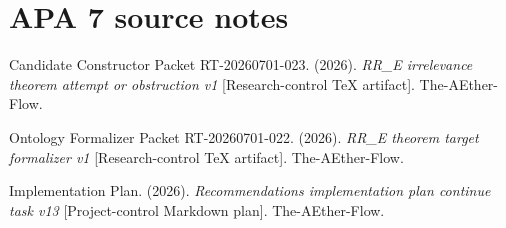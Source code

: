\documentclass[11pt]{article}
\begin{document}
\section{APA 7 source notes}

Candidate Constructor Packet RT-20260701-023. (2026). \emph{RR\_E
irrelevance theorem attempt or obstruction v1} [Research-control TeX
artifact]. The-AEther-Flow.

Ontology Formalizer Packet RT-20260701-022. (2026). \emph{RR\_E theorem
target formalizer v1} [Research-control TeX artifact]. The-AEther-Flow.

Implementation Plan. (2026). \emph{Recommendations implementation plan
continue task v13} [Project-control Markdown plan]. The-AEther-Flow.
\end{document}
